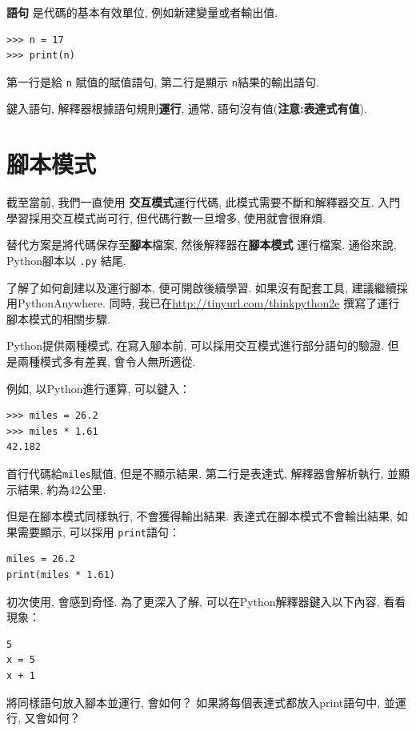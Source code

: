 \documentclass[10pt]{book}
\begin{document}
 {\bf 語句} 是代碼的基本有效單位, 例如新建變量或者輸出值. 

\begin{verbatim}
>>> n = 17
>>> print(n)
\end{verbatim}
%
第一行是給 {\tt n} 賦值的賦值語句, 第二行是顯示 {\tt n}結果的輸出語句. 

鍵入語句, 解釋器根據語句規則{\bf 運行}, 通常, 語句沒有值({\bf 注意:表達式有值}). 


\section{腳本模式}

截至當前, 我們一直使用 {\bf 交互模式}運行代碼, 
此模式需要不斷和解釋器交互. 
入門學習採用交互模式尚可行, 
但代碼行數一旦增多, 使用就會很麻煩. 

替代方案是將代碼保存至{\bf 腳本}檔案, 然後解釋器在{\bf 腳本模式}
運行檔案. 通俗來說, Python腳本以 {\tt .py} 結尾. 

了解了如何創建以及運行腳本, 便可開啟後續學習. 
如果沒有配套工具, 建議繼續採用PythonAnywhere. 
同時, 我已在\url{http://tinyurl.com/thinkpython2e}
撰寫了運行腳本模式的相關步驟. 

Python提供兩種模式, 在寫入腳本前, 
可以採用交互模式進行部分語句的驗證. 
但是兩種模式多有差異, 會令人無所適從. 

例如, 以Python進行運算, 可以鍵入：

\begin{verbatim}
>>> miles = 26.2
>>> miles * 1.61
42.182
\end{verbatim}

首行代碼給{\tt miles}賦值, 但是不顯示結果. 
第二行是表達式, 解釋器會解析執行, 並顯示結果, 約為42公里. 

但是在腳本模式同樣執行, 不會獲得輸出結果. 
表達式在腳本模式不會輸出結果, 如果需要顯示, 可以採用 {\tt print}語句：

\begin{verbatim}
miles = 26.2
print(miles * 1.61)
\end{verbatim}

初次使用, 會感到奇怪. 為了更深入了解, 
可以在Python解釋器鍵入以下內容, 看看現象：

\begin{verbatim}
5
x = 5
x + 1
\end{verbatim}

將同樣語句放入腳本並運行, 會如何？
如果將每個表達式都放入print語句中, 並運行, 又會如何？
\end{document}
